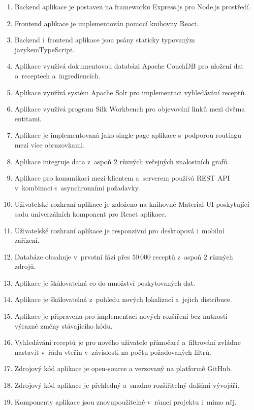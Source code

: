 \begin{enumerate}
    \item Backend aplikace je postaven na frameworku Express.js pro Node.js prostředí.
    \item Frontend aplikace je implementován pomocí knihovny React.
    \item Backend i~frontend aplikace jsou psány staticky typovaným jazykem\newline TypeScript.
    \item Aplikace využívá dokumentovou databázi Apache CouchDB pro uložení dat o~receptech a~ingrediencích.
    \item Aplikace využívá systém Apache Solr pro implementaci vyhledávání receptů.
    \item Aplikace využívá program Silk Workbench pro objevování linků mezi dvěma entitami.
    \item Aplikace je implementovaná jako single-page aplikace s~podporou routingu mezi více obrazovkami.
    \item Aplikace integruje data z~aspoň 2 různých veřejných znalostních grafů.
    \item Aplikace pro komunikaci mezi klientem a~serverem používá REST API v~kombinaci s~asynchronními požadavky. 
    \item Uživatelské rozhraní aplikace je založeno na knihovně Material UI poskytující sadu univerzálních komponent pro React aplikace.
    \item Uživatelské rozhraní aplikace je responzivní pro desktopová i~mobilní zařízení.
    \item Databáze obsahuje v~prvotní fázi přes $50\,000$ receptů z~aspoň $2$ různých zdrojů.
    \item Aplikace je škálovatelná co do množství poskytovaných dat.
    \item Aplikace je škálovatelná z~pohledu nových lokalizací a~jejich distribuce.
    \item Aplikace je připravena pro implementaci nových rozšíření bez nutnosti výrazné změny stávajícího kódu.
    \item Vyhledávání receptů je pro nového uživatele přímočaré a~filtrování zvládne nastavit v~řádu vteřin v~závislosti na počtu požadovaných filtrů.
    \item Zdrojový kód aplikace je open-source a verzovaný na platformě GitHub.
    \item Zdrojový kód aplikace je přehledný a~snadno rozšiřitelný dalšími vývojáři.
    \item Komponenty aplikace jsou znovupoužitelné v~rámci projektu i~mimo něj.

\end{enumerate}

